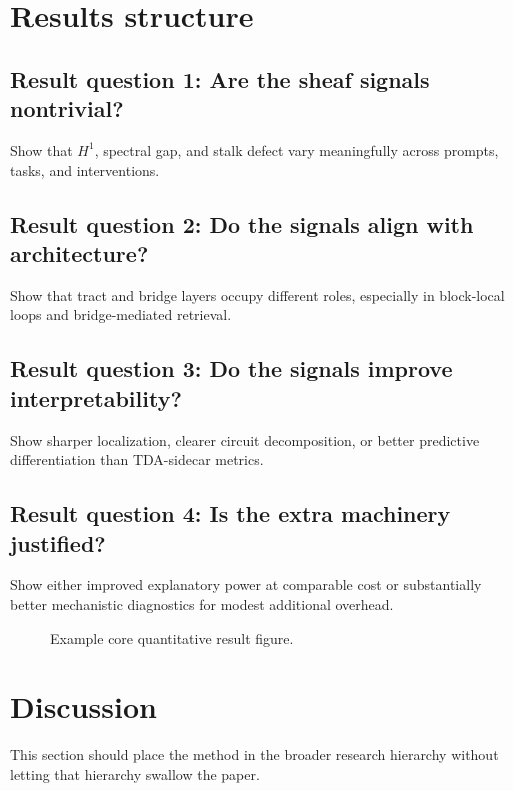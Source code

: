 \documentclass[11pt]{article}
\begin{document}
\section{Results structure}

\subsection*{Result question 1: Are the sheaf signals nontrivial?}
Show that $H^1$, spectral gap, and stalk defect vary meaningfully across prompts, tasks, and interventions.

\subsection*{Result question 2: Do the signals align with architecture?}
Show that tract and bridge layers occupy different roles, especially in block-local loops and bridge-mediated retrieval.

\subsection*{Result question 3: Do the signals improve interpretability?}
Show sharper localization, clearer circuit decomposition, or better predictive differentiation than TDA-sidecar metrics.

\subsection*{Result question 4: Is the extra machinery justified?}
Show either improved explanatory power at comparable cost or substantially better mechanistic diagnostics for modest additional overhead.

\begin{figure}[H]
\centering
{}
\caption{Example core quantitative result figure.}
\end{figure}

\section{Discussion}

This section should place the method in the broader research hierarchy without letting that hierarchy swallow the paper.
\end{document}
